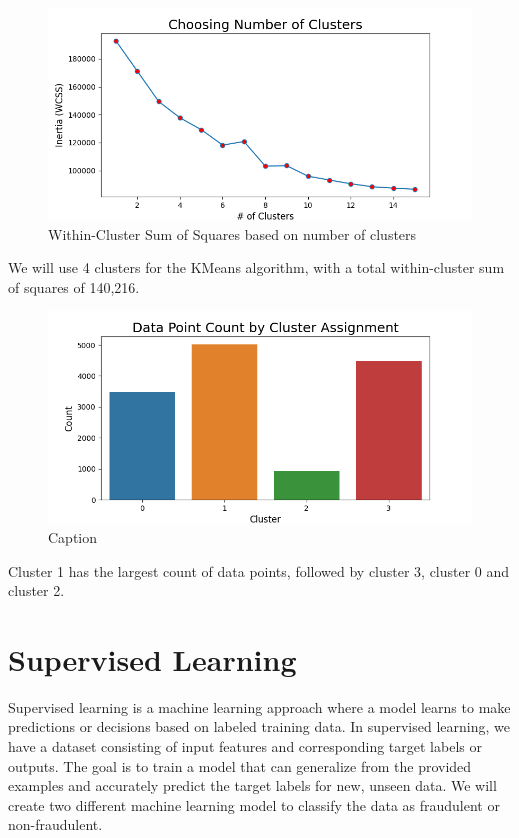 \documentclass[12pt]{article}
\begin{document}
\begin{figure}[h]
    \centering
    \includegraphics[width=\textwidth]{images/kmeans_inertia.png}
    \caption{Within-Cluster Sum of Squares based on number of clusters}
    \label{fig:my_label}
\end{figure}
\newpage
We will use 4 clusters for the KMeans algorithm, with a total within-cluster sum of squares of 140,216.
\begin{figure}[h]
    \centering
    \includegraphics[width=1\textwidth]{images/count_by_cluster.png}
    \caption{Caption}
    \label{fig:my_label}
\end{figure}
\newpage
Cluster 1 has the largest count of data points, followed by cluster 3, cluster 0 and cluster 2.

\section{Supervised Learning}
Supervised learning is a machine learning approach where a model learns to make predictions or decisions based on labeled training data. In supervised learning, we have a dataset consisting of input features and corresponding target labels or outputs. The goal is to train a model that can generalize from the provided examples and accurately predict the target labels for new, unseen data. We will create two different machine learning model to classify the data as fraudulent or non-fraudulent.
\end{document}
